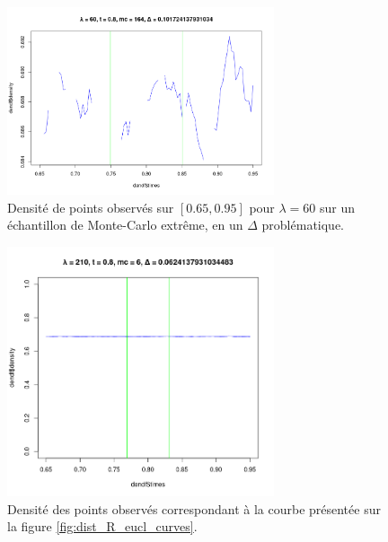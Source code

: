 \begin{figure}[H]
	\centering
	\includegraphics[width=0.7\textwidth]{Images/indiv_vs_glob/Tdensity_lbd60_mc164.png}
	\caption{Densité de points observés sur $[0.65, 0.95]$ pour $\lambda = 60$ sur un échantillon de Monte-Carlo extrême, en un $\Delta$ problématique.}
	\label{fig:den_ex}
\end{figure}


\begin{figure}[H]
	\centering
	\includegraphics[width=0.7\textwidth]{Images/indiv_vs_glob/worst_210_67_mc6.png}
	\caption{Densité des points observés correspondant à la courbe présentée sur la figure \ref{fig:dist_R_eucl_curves}.}
	\label{fig:den_counterex}
\end{figure}








